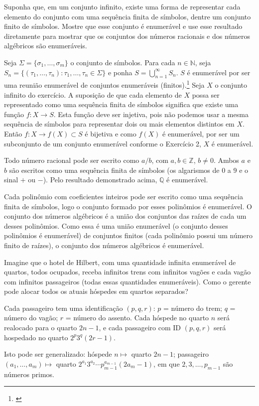 \begin{exercicio}
	Suponha que, em um conjunto infinito, existe uma forma de representar cada elemento do conjunto com uma sequência finita de símbolos, dentre um conjunto finito de símbolos. Mostre que esse conjunto é enumerável e use esse resultado diretamente para mostrar que os conjuntos dos números racionais e dos números algébricos são enumeráveis.
\end{exercicio}
\begin{solucao}
	Seja $\Sigma=\{\sigma_1,\ldots,\sigma_m\}$ o conjunto de símbolos. Para cada $n\in\mathbb{N}$, seja $S_n=\{(\tau_1,\ldots,\tau_n):\tau_1,\ldots,\tau_n\in \Sigma\}$ e ponha $S=\bigcup_{n=1}^\infty S_n$. $S$ é enumerável por ser uma reunião enumerável de conjuntos enumeráveis (finitos).\footnote{\cite[p. 51]{LimaCA}} Seja $X$ o conjunto infinito do exercício. A suposição de que cada elemento de $X$ possa ser representado como uma sequência finita de símbolos significa que existe uma função $f:X\to S$. Esta função deve ser injetiva, pois não podemos usar a mesma sequência de símbolos para representar dois ou mais elementos distintos em $X$. Então $f: X\to f(X)\subset S$ é bijetiva e como $f(X)$ é enumerável, por ser um subconjunto de um conjunto enumerável conforme o Exercício 2, $X$ é enumerável.
	
	Todo número racional pode ser escrito como $a/b$, com $a,b\in \mathbb{Z}$, $b\neq 0$. Ambos $a$ e $b$ são escritos como uma sequência finita de símbolos (os algarismos de 0 a 9 e o sinal $+$ ou $-$). Pelo resultado demonstrado acima, $\mathbb{Q}$ é enumerável.
	
	Cada polinômio com coeficientes inteiros pode ser escrito como uma sequência finita de símbolos, logo o conjunto formado por esses polinômios é enumerável. O conjunto dos números algébricos é a união dos conjuntos das raízes de cada um desses polinômios. Como essa é uma união enumerável (o conjunto desses polinômios é enumerável) de conjuntos finitos (cada polinômio possui um número finito de raízes), o conjunto dos números algébricos é enumerável.
\end{solucao}

\begin{exercicio}
	Imagine que o hotel de Hilbert, com uma quantidade infinita enumerável de quartos, todos ocupados, receba infinitos trens com infinitos vagões e cada vagão com infinitos passageiros (todas essas quantidades enumeráveis). Como o gerente pode alocar todos os atuais hóspedes em quartos separados?
\end{exercicio}
\begin{solucao}
	Cada passageiro tem uma identificação $(p,q,r)$: $p$ = número do trem; $q$ = número do vagão; $r$ = número do assento. Cada hóspede no quarto $n$ será realocado para o quarto $2n-1$, e cada passageiro com ID $(p,q,r)$ será hospedado no quarto $2^p3^q(2r-1)$.
	
	Isto pode ser generalizado: hóspede $n\mapsto$ quarto $2n-1$; passageiro $(a_1,\ldots,a_m)\mapsto$ quarto $2^{a_1}3^{a_2}\cdots p_{m-1}^{a_{m-1}}(2a_m-1)$, em que $2,3,\ldots,p_{m-1}$ são números primos.
\end{solucao}

